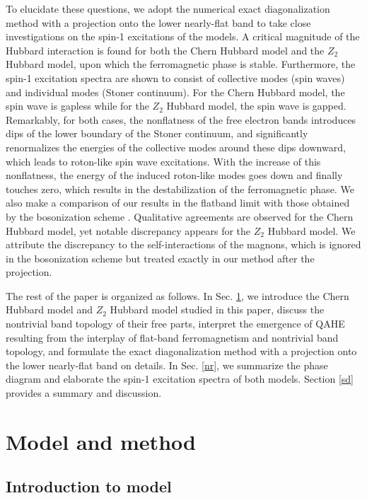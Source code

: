 \documentclass[amsmath,superscriptaddress,showpacs,aps,prb,twocolumn]{revtex4-1}
\begin{document}
\par To elucidate these questions, we adopt the numerical exact diagonalization method with a projection onto the lower nearly-flat band to take close investigations on the spin-1 excitations of the models. A critical magnitude of the Hubbard interaction is found for both the Chern Hubbard model and the $Z_2$ Hubbard model, upon which the ferromagnetic phase is stable. Furthermore, the spin-1 excitation spectra are shown to consist of collective modes (spin waves) and individual modes (Stoner continuum). For the Chern Hubbard model, the spin wave is gapless while for the $Z_2$ Hubbard model, the spin wave is gapped. Remarkably, for both cases, the nonflatness of the free electron bands introduces dips of the lower boundary of the Stoner continuum, and significantly renormalizes the energies of the collective modes around these dips downward, which leads to roton-like spin wave excitations. With the increase of this nonflatness, the energy of the induced roton-like modes goes down and finally touches zero, which results in the destabilization of the ferromagnetic phase. We also make a comparison of our results in the flatband limit with those obtained by the bosonization scheme \cite{DG_PRB2015}. Qualitative agreements are observed for the Chern Hubbard model, yet notable discrepancy appears for the $Z_2$ Hubbard model. We attribute the discrepancy to the self-interactions of the magnons, which is ignored in the bosonization scheme but treated exactly in our method after the projection.

\par The rest of the paper is organized as follows. In Sec. \ref{mm}, we introduce the Chern Hubbard model and $Z_2$ Hubbard model studied in this paper, discuss the nontrivial band topology of their free parts, interpret the emergence of QAHE resulting from the interplay of flat-band ferromagnetism and nontrivial band topology, and formulate the exact diagonalization method with a projection onto the lower nearly-flat band on details. In Sec. \ref{nr}, we summarize the phase diagram and elaborate the spin-1 excitation spectra of both models. Section \ref{sd} provides a summary and discussion.

\section{Model and method}\label{mm}
\subsection{Introduction to model}\label{intro_to_model}
\end{document}
